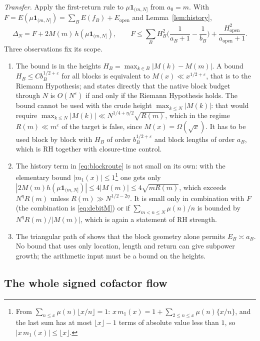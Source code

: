 \documentclass[11pt]{article}
\theoremstyle{definition}
\theoremstyle{remark}
\begin{document}
\emph{Transfer.} Apply the first-return rule to $\mu\mathbf 1_{(m,N]}$ from $a_0=m$. With $F=E(\mu\mathbf 1_{(m,N]})=\sum_BE(f_B)+E_{\mathrm{open}}$ and Lemma~\ref{lem:history},
\begin{equation}\label{eq:blockroute}
\Delta_N=F+2M(m)\,h(\mu\mathbf 1_{(m,N]}),\qquad F\le\sum_BH_B^2\Big(\frac1{a_B+1}-\frac1{b_B}\Big)+\frac{H_{\mathrm{open}}^2}{a_{\mathrm{open}}+1}.
\end{equation}
Three observations fix its scope.
\begin{enumerate}
\item[(a)] The bound is in the heights $H_B=\max_{k\in B}|M(k)-M(m)|$. A bound $H_B\le Cb_B^{1/2+\varepsilon}$ for all blocks is equivalent to $M(x)\ll x^{1/2+\varepsilon}$, that is to the Riemann Hypothesis; and \cite[\S12, the equivalence (iv)]{mm2} states directly that the native block budget through $N$ is $O(N^\varepsilon)$ if and only if the Riemann Hypothesis holds. The bound cannot be used with the crude height $\max_{k\le N}|M(k)|$: that would require $\max_{k\le N}|M(k)|\ll N^{1/4+\eta/2}\sqrt{R(m)}$, which in the regime $R(m)\ll m^{\varepsilon}$ of the target is false, since $M(x)=\Omega(\sqrt x)$. It has to be used block by block with $H_B$ of order $b_B^{1/2+\varepsilon}$ and block lengths of order $a_B$, which is RH together with closure-time control.
\item[(b)] The history term in \eqref{eq:blockroute} is not small on its own: with the elementary bound $|m_1(x)|\le1$\footnote{From $\sum_{n\le x}\mu(n)\lfloor x/n\rfloor=1$: $x\,m_1(x)=1+\sum_{2\le n\le x}\mu(n)\{x/n\}$, and the last sum has at most $\lfloor x\rfloor-1$ terms of absolute value less than $1$, so $|x\,m_1(x)|\le\lfloor x\rfloor$.} one gets only $|2M(m)h(\mu\mathbf 1_{(m,N]})|\le4|M(m)|\le4\sqrt{mR(m)}$, which exceeds $N^\eta R(m)$ unless $R(m)\gg N^{1/2-2\eta}$. It is small only in combination with $F$ (the combination is \eqref{eq:debitM}) or if $\sum_{m<n\le N}\mu(n)/n$ is bounded by $N^\eta R(m)/|M(m)|$, which is again a statement of RH strength.
\item[(c)] The triangular path of \cite[\S9, the limit $E^\triangle_a/a\to2+2\log\frac32-4\log2$]{mm2} shows that the block geometry alone permits $E_B\asymp a_B$. No bound that uses only location, length and return can give subpower growth; the arithmetic input must be a bound on the heights.
\end{enumerate}

\subsection{The whole signed cofactor flow}
\end{document}
